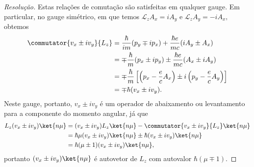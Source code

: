 \begin{proof}[Resolução]
   Estas relações de comutação são satisfeitas em qualquer gauge. Em particular, no gauge simétrico, em que temos \(\mathcal{L}_z A_x = iA_y\) e \(\mathcal{L}_z A_y = - i A_x,\) obtemos
   \begin{align*}
      \commutator{v_x \pm i v_y}{L_z} &= \frac{\hbar}{im} (p_y \mp i p_x) + \frac{\hbar e}{mc} (iA_y  \pm A_x)\\
                                      &= \mp \frac{\hbar}{m} (p_x \pm i p_y) \pm \frac{\hbar e}{mc} (A_x \pm i A_y)\\
                                      &= \mp \frac{\hbar}{m} \left[\left(p_x - \frac{e}{c} A_x\right) \pm i\left(p_y - \frac{e}{c}A_y\right)\right]\\
                                      &= \mp \hbar (v_x \pm i v_y).
   \end{align*}
   Neste gauge, portanto, \(v_x \pm i v_y\) é um operador de abaixamento ou levantamento para a componente do momento angular, já que
   \begin{align*}
      L_z (v_x \pm i v_y) \ket{n \mu} &= (v_x \pm i v_y) L_z \ket{n\mu} - \commutator{v_x \pm i v_y}{L_z} \ket{n\mu}\\
                                      &= \hbar \mu (v_x \pm i v_y) \ket{n \mu} \pm \hbar (v_x \pm i v_y) \ket{n \mu}\\
                                      &= \hbar (\mu \pm 1) (v_x \pm i v_y)\ket{n \mu},
   \end{align*}
   portanto \((v_x \pm i v_y)\ket{n \mu}\) é autovetor de \(L_z\) com autovalor \(\hbar (\mu \mp 1).\)
\end{proof}
